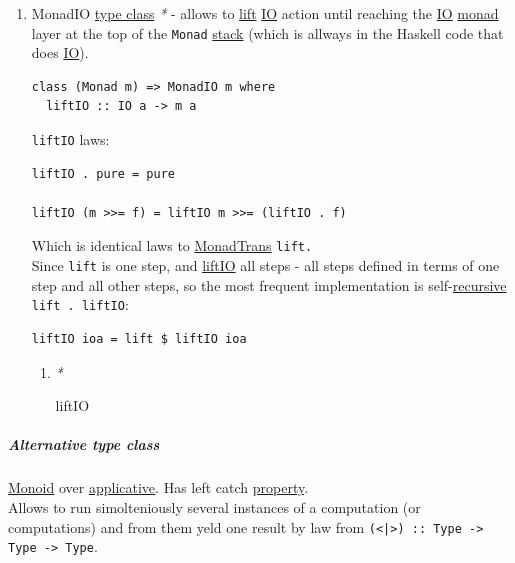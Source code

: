 \documentclass[11pt]{article}
\begin{document}
\begin{enumerate}
\begin{enumerate}
\begin{enumerate}
\item \label{org8faa81a}MonadIO \hyperref[org16d8a26]{type class}
\label{sec:orga308277}
\emph{*} - allows to \hyperref[org47dee33]{lift} \hyperref[orga8c8a87]{IO} action until reaching the \hyperref[orga8c8a87]{IO} \hyperref[org86a5d95]{monad} layer at the top of the \texttt{Monad} \hyperref[org02af145]{stack} (which is allways in the Haskell code that does \hyperref[orga8c8a87]{IO}).\\

\begin{verbatim}
class (Monad m) => MonadIO m where
  liftIO :: IO a -> m a
\end{verbatim}

\texttt{liftIO} laws:\\
\begin{verbatim}
liftIO . pure = pure

liftIO (m >>= f) = liftIO m >>= (liftIO . f)
\end{verbatim}

Which is identical laws to \hyperref[orge3b9a95]{MonadTrans} \texttt{lift.}\\

Since \texttt{lift} is one step, and \hyperref[org9380898]{liftIO} all steps - all steps defined in terms of one step and all other steps, so the most frequent implementation is self-\hyperref[orgf513e66]{recursive} \texttt{lift . liftIO}:\\

\begin{verbatim}
liftIO ioa = lift $ liftIO ioa
\end{verbatim}

\begin{enumerate}
\item \emph{*}
\label{sec:org85e88ee}

\label{org9380898}liftIO\\
\end{enumerate}
\end{enumerate}
\end{enumerate}
\end{enumerate}

\subparagraph{\label{orga3d4b47}Alternative type class}
\label{sec:orgc8c85eb}
\hyperref[org37d140b]{Monoid} over \hyperref[org2dfdf4a]{applicative}. Has left catch \hyperref[orgf8c3cc7]{property}.\\

Allows to run simolteniously several instances of a computation (or computations) and from them yeld one result by law from \texttt{(<|>) :: Type -> Type -> Type}.\\
\end{document}
